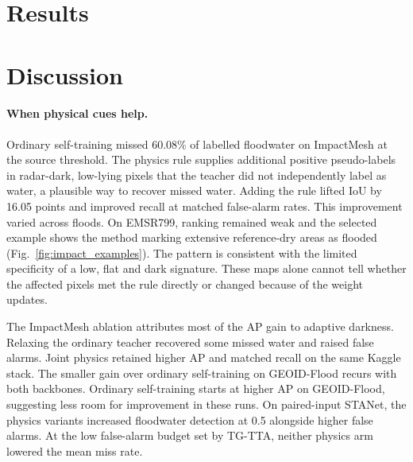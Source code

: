 \documentclass[a4paper,fleqn]{cas-sc}
\begin{document}
\section{Results}
\label{sec:results}




\section{Discussion}
\label{sec:discussion}

\paragraph{When physical cues help.} Ordinary self-training missed 60.08\% of labelled floodwater on ImpactMesh at the source threshold. The physics rule supplies additional positive pseudo-labels in radar-dark, low-lying pixels that the teacher did not independently label as water, a plausible way to recover missed water. Adding the rule lifted IoU by 16.05 points and improved recall at matched false-alarm rates. This improvement varied across floods. On EMSR799, ranking remained weak and the selected example shows the method marking extensive reference-dry areas as flooded (Fig.~\ref{fig:impact_examples}). The pattern is consistent with the limited specificity of a low, flat and dark signature. These maps alone cannot tell whether the affected pixels met the rule directly or changed because of the weight updates.

The ImpactMesh ablation attributes most of the AP gain to adaptive darkness. Relaxing the ordinary teacher recovered some missed water and raised false alarms. Joint physics retained higher AP and matched recall on the same Kaggle stack. The smaller gain over ordinary self-training on GEOID-Flood recurs with both backbones. Ordinary self-training starts at higher AP on GEOID-Flood, suggesting less room for improvement in these runs. On paired-input STANet, the physics variants increased floodwater detection at 0.5 alongside higher false alarms. At the low false-alarm budget set by TG-TTA, neither physics arm lowered the mean miss rate.
\end{document}
